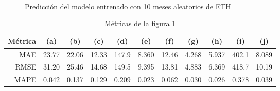 \documentclass[a4paper,10pt]{article}
\begin{document}
\begin{figure}[h]
    \\
  \caption{Predicción del modelo entrenado con 10 meses aleatorios de ETH}
  \label{f:eth_mth_arima}
\end{figure}

\begin{table}[h]
 \begin{center}
  \begin{tabular}{|r|c|c|c|c|c|c|c|c|c|c|}
    Métrica & (a) & (b) & (c) & (d) & (e) & (f) & (g) & (h) & (i) & (j) \\ \hline
    MAE & 23.77 & 22.06 & 12.33 & 147.9 & 8.360 & 12.46 & 4.268 & 5.937 & 402.1 & 8.089 \\
    RMSE & 31.20 & 25.46 & 14.68 & 149.5 & 9.395 & 13.81 & 4.883 & 6.369 & 418.7 & 10.19 \\
    MAPE & 0.042 & 0.137 & 0.129 & 0.209 & 0.023 & 0.062 & 0.030 & 0.026 & 0.378 & 0.039 \\ \hline
  \end{tabular}
  \caption{Métricas de la figura \ref{f:eth_mth_arima}}
  \label{tab:eth_m}
 \end{center}
\end{table}
\end{document}
